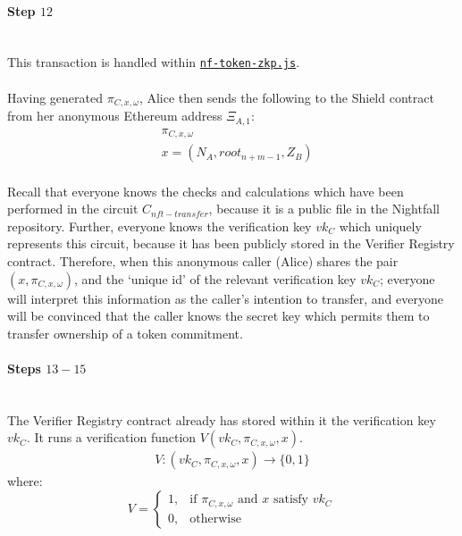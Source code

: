 \documentclass{article}
\begin{document}
\paragraph{Step $12$}
\ \\
This transaction is handled within \hyperref[sec:nf-token-zkp]{\texttt{nf-token-zkp.js}}.\\
\\
Having generated $\pi_{C,x,\omega}$, Alice then sends the following to the Shield contract from her anonymous Ethereum address $\Xi_{A,1}$:
\begin{align*}
  &\pi_{C,x,\omega}\\
  &x = (N_{A}, root_{n+m-1}, Z_B)
\end{align*}
\\
Recall that everyone knows the checks and calculations which have been performed in the circuit $C_{nft-transfer}$, because it is a public file in the Nightfall repository. Further, everyone knows the verification key $vk_C$ which uniquely represents this circuit, because it has been publicly stored in the Verifier Registry contract. Therefore, when this anonymous caller (Alice) shares the pair $(x, \pi_{C,x,\omega})$, and the `unique id' of the relevant verification key $vk_C$; everyone will interpret this information as the caller's intention to transfer, and everyone will be convinced that the caller knows the secret key which permits them to transfer ownership of a token commitment.




\paragraph{Steps $13 - 15$}
\ \\
The Verifier Registry contract already has stored within it the verification key $vk_C$.
It runs a verification function $V(vk_C, \pi_{C,x,\omega}, x)$.
\begin{align*}
  V: (vk_C, \pi_{C,x,\omega}, x) \to \{0,1\}
\end{align*}
where:
\[
    V=
\begin{cases}
    1,& \text{if } \pi_{C,x,\omega} \text{ and } x \text{ satisfy } vk_C\\
    0,& \text{otherwise}
\end{cases}
\]
\end{document}
